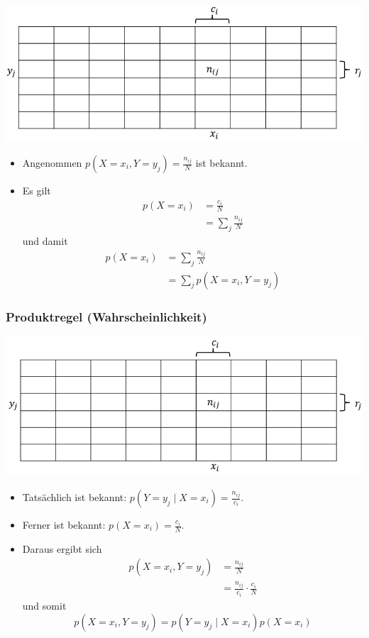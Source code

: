 \documentclass{scrartcl}
\begin{document}
\includegraphics[width=\linewidth]{figures/summenregel.png}

\begin{itemize}
	\item Angenommen $ p(X = x_i, Y = y_j) = \frac{n_{ij}}{N} $ ist bekannt.
	\item Es gilt
	\begin{align*}
		p(X = x_i) &= \frac{c_i}{N} \\
		&= \sum_j \frac{n_{ij}}{N}
	\end{align*}
	und damit
	\begin{align*}
		p(X = x_i) &= \sum_j \frac{n_{ij}}{N} \\
		&= \sum_j p(X = x_i, Y = y_j)
	\end{align*}
\end{itemize}

\subsubsection{Produktregel (Wahrscheinlichkeit)}

\includegraphics[width=\linewidth]{figures/produktregel.png}

\begin{itemize}
	\item Tatsächlich ist bekannt: $ p(Y = y_j \mid X = x_i) = 
	\frac{n_{ij}}{c_i} $.
	\item Ferner ist bekannt: $ p(X = x_i) = \frac{c_i}{N} $.
	\item Daraus ergibt sich
	\begin{align*}
		p(X = x_i, Y = y_j) &= \frac{n_{ij}}{N} \\
		&= \frac{n_{ij}}{c_i} \cdot \frac{c_i}{N}
	\end{align*}
	und somit
	\[ p(X = x_i, Y = y_j) = p(Y = y_j \mid X = x_i) p(X = x_i) \]
\end{itemize}
\end{document}
